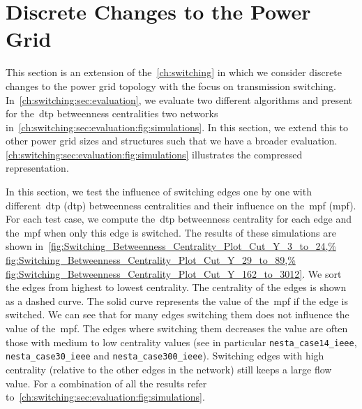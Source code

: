 \chapter{Discrete Changes to the Power Grid}
\label{ch:appendix:sec:switching:simulations}
% 
This section is an extension of the~\cref{ch:switching} in which we consider
discrete changes to the power grid topology with the focus on transmission
switching. In~\cref{ch:switching:sec:evaluation}, we evaluate two different
algorithms and present for the~\gls{dtp} betweenness centralities two networks
in~\cref{ch:switching:sec:evaluation:fig:simulations}. In this
section, we extend this to other power grid sizes and structures such that we
have a broader evaluation.
\cref{ch:switching:sec:evaluation:fig:simulations} illustrates the
compressed representation.

In this section, we test the influence of switching edges one by one with
different~\acrlong{dtp} (\gls{dtp}) betweenness centralities and their influence
on the~\acrlong{mpf} (\gls{mpf}). For each test case, we compute the~\gls{dtp}
betweenness centrality for each edge and the~\gls{mpf} when only this edge is
switched. The results of these simulations are shown in~\cref{fig:Switching_Betweenness_Centrality_Plot_Cut_Y_3_to_24,%
fig:Switching_Betweenness_Centrality_Plot_Cut_Y_29_to_89,%
fig:Switching_Betweenness_Centrality_Plot_Cut_Y_162_to_3012}. 
% 
We sort the edges from highest to lowest centrality. The centrality of the
edges is shown as a dashed curve. The solid curve represents the value of
the~\gls{mpf} if the edge is switched. We can see that for many edges
switching them does not influence the value of the~\gls{mpf}. The edges
where switching them decreases the value are often those with medium to low
centrality values (see in particular \texttt{nesta\_case14\_ieee},
\texttt{nesta\_case30\_ieee} and \texttt{nesta\_case300\_ieee}). Switching edges
with high centrality (relative to the other edges in the network) still keeps a
large flow value. For a combination of all the results refer
to~\cref{ch:switching:sec:evaluation:fig:simulations}.

